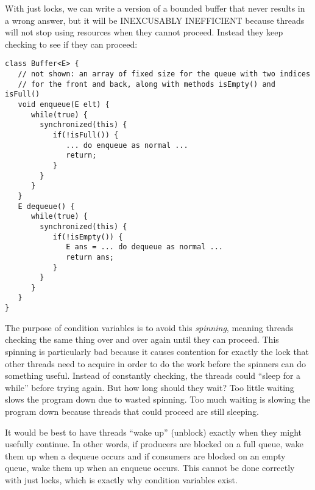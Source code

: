 \documentclass[10pt]{article}
\begin{document}
With just locks, we can write a version of a bounded buffer that
never results in a wrong answer, but it will be INEXCUSABLY
INEFFICIENT because threads will not stop using resources when they
cannot proceed.  Instead they keep checking to see if they can
proceed:
\begin{verbatim}
class Buffer<E> {
   // not shown: an array of fixed size for the queue with two indices
   // for the front and back, along with methods isEmpty() and isFull()
   void enqueue(E elt) {
      while(true) {
        synchronized(this) {
           if(!isFull()) {
              ... do enqueue as normal ...
              return;
           }
        }
      }
   }
   E dequeue() {
      while(true) {
        synchronized(this) {
           if(!isEmpty()) {
              E ans = ... do dequeue as normal ...
              return ans;
           }
        }
      }
   }
}
\end{verbatim}
The purpose of condition variables is to avoid this \emph{spinning},
meaning threads checking the same thing over and over again until they
can proceed.  This spinning is particularly bad because it causes
contention for exactly the lock that other threads need to acquire in
order to do the work before the spinners can do something useful.
Instead of constantly checking, the threads could ``sleep for a
while'' before trying again.  But how long should they wait?  Too
little waiting slows the program down due to wasted spinning.  Too
much waiting is slowing the program down because threads that could
proceed are still sleeping.

It would be best to have threads ``wake up'' (unblock) exactly when
they might usefully continue.  In other words, if producers are
blocked on a full queue, wake them up when a dequeue occurs and if
consumers are blocked on an empty queue, wake them up when an enqueue
occurs.  This cannot be done correctly with just locks, which is
exactly why condition variables exist.  
\end{document}
